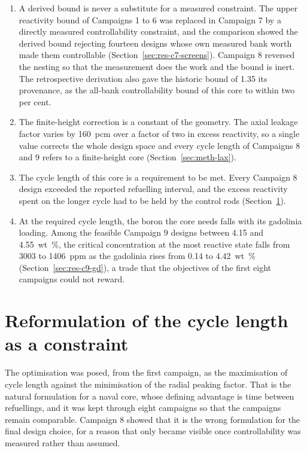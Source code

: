 \begin{enumerate}
  \item A derived bound is never a substitute for a measured
        constraint. The upper reactivity bound of Campaigns 1 to 6 was
        replaced in Campaign 7 by a directly measured controllability
constraint, and the comparison showed the derived bound
        rejecting fourteen designs whose own measured bank worth made
        them controllable (Section~\ref{sec:res-c7-screens}). Campaign
        8 reversed the nesting so that the measurement does the work
        and the bound is inert. The retrospective derivation also gave
        the historic bound of 1.35 its provenance, as the all-bank
        controllability bound of this core to within two per cent.

  \item The finite-height correction is a constant of the geometry.
        The axial leakage factor varies by \SI{160}{pcm} over a factor
        of two in excess reactivity, so a single value corrects the
        whole design space and every cycle length of Campaigns 8 and 9
        refers to a finite-height core (Section~\ref{sec:meth-lax}).

  \item The cycle length of this core is a requirement to be met. Every
        Campaign 8 design exceeded the reported refuelling interval,
        and the excess reactivity spent on the longer cycle had to be
        held by the control rods (Section~\ref{sec:concl-reform}).

  \item At the required cycle length, the boron the core needs falls
        with its gadolinia loading. Among the feasible Campaign 9
        designs between 4.15 and \SI{4.55}{wt\%}, the critical
        concentration at the most reactive state falls from 3003 to
        \SI{1406}{ppm} as the gadolinia rises from 0.14 to
        \SI{4.42}{wt\%} (Section~\ref{sec:res-c9-gd}), a trade that the
        objectives of the first eight campaigns could not reward.
\end{enumerate}

\section{Reformulation of the cycle length as a constraint}
\label{sec:concl-reform}

The optimisation was posed, from the first campaign, as the
maximisation of cycle length against the minimisation of the radial
peaking factor. That is the natural formulation for a naval core,
whose defining advantage is time between refuellings, and it was kept
through eight campaigns so that the campaigns remain comparable.
Campaign 8 showed that it is the wrong formulation for the final design
choice, for a reason that only became visible once controllability was
measured rather than assumed.

